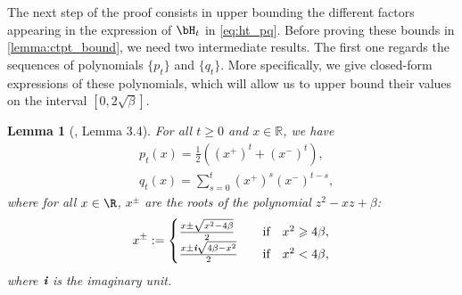\documentclass{article}
\theoremstyle{plain}
\newtheorem{lemma}[theorem]{Lemma}
\theoremstyle{definition}
\theoremstyle{remark}
\begin{document}
The next step of the proof consists in upper bounding the different factors appearing in the expression of $\bH_t$ in \eqref{eq:ht_pq}. Before proving these bounds in \cref{lemma:ctpt_bound}, we need two intermediate results. The first one regards the sequences of polynomials $\{p_t\}$ and $\{q_t\}$. More specifically, we give closed-form expressions of these polynomials, which will allow us to upper bound their values on the interval $[0, 2\sqrt{\beta}]$.

\begin{lemma}[\citet{xu2023anpm}, Lemma 3.4]\label{lemma:ptqt_closed}
  For all $t\geqslant 0$ and $x\in \mathbb{R}$, we have
  \begin{align*}
    & p_t(x) = \frac{1}{2}\left( (x^+)^t + (x^-)^t \right), \\
    & q_t(x) = \sum_{s=0}^{t} (x^+)^s (x^-)^{t-s}, 
  \end{align*}
  where for all $x \in \R$, $x^\pm$ are the roots of the polynomial $z^2 - xz + \beta$:
  \begin{align}\label{eq:def_xpm}
    x^\pm := \begin{cases}
      \frac{x \pm \sqrt{x^2 - 4\beta}}{2} \quad & \mbox{if} \quad x^2 \geqslant 4\beta, \\
      \frac{x \pm \textit{\textbf{i}} \sqrt{4\beta - x^2}}{2} \quad & \mbox{if} \quad x^2 < 4\beta,
    \end{cases}
  \end{align}
  where $\textit{\textbf{i}}$ is the imaginary unit.
\end{lemma}
\end{document}
